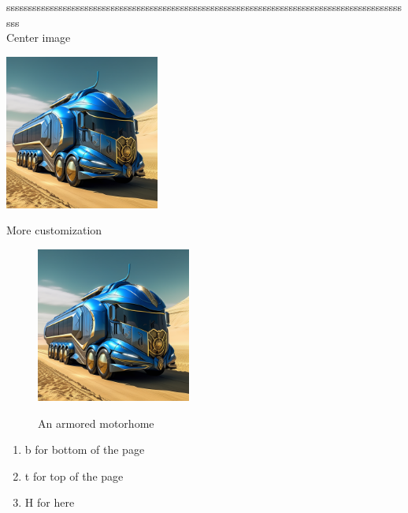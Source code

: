 \documentclass[11pt]{article}
\begin{document}
ssssssssssssssssssssssssssssssssssssssssssssssssssssssssssssssssssssssssssssssssssssssssssssss\\
Center image
\begin{center}
\includegraphics[width=2in]{armored_motorhome.png}
\end{center}
More customization

\begin{figure}[H]
\centering
\includegraphics[width=2in]{armored_motorhome.png}\\
\caption{An armored motorhome}
\end{figure}

\begin{enumerate}
\item b for bottom of the page
\item t for top of the page
\item H for here
\end{enumerate}
\end{document}
